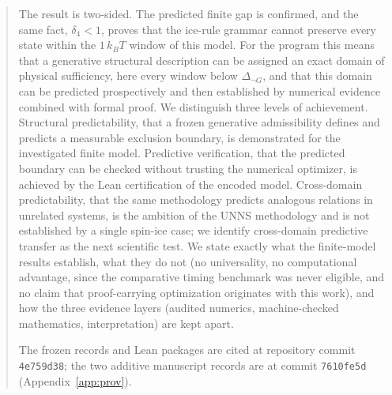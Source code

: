 \documentclass[11pt,a4paper]{article}
\theoremstyle{plain}
\theoremstyle{definition}
\theoremstyle{remark}
\begin{document}
\begin{abstract}
The result is two-sided. The predicted finite gap is confirmed, and the same fact, $\delta_4<1$, proves that the ice-rule grammar cannot preserve every state within the $1\,k_BT$ window of this model. For the program this means that a generative structural description can be assigned an exact domain of physical sufficiency, here every window below $\Delta_{\neg G}$, and that this domain can be predicted prospectively and then established by numerical evidence combined with formal proof. We distinguish three levels of achievement. Structural predictability, that a frozen generative admissibility defines and predicts a measurable exclusion boundary, is demonstrated for the investigated finite model. Predictive verification, that the predicted boundary can be checked without trusting the numerical optimizer, is achieved by the Lean certification of the encoded model. Cross-domain predictability, that the same methodology predicts analogous relations in unrelated systems, is the ambition of the UNNS methodology and is not established by a single spin-ice case; we identify cross-domain predictive transfer as the next scientific test. We state exactly what the finite-model results establish, what they do not (no universality, no computational advantage, since the comparative timing benchmark was never eligible, and no claim that proof-carrying optimization originates with this work), and how the three evidence layers (audited numerics, machine-checked mathematics, interpretation) are kept apart.

The frozen records and Lean packages are cited at repository commit \texttt{4e759d38}; the two additive manuscript records are at commit \texttt{7610fe5d} (Appendix~\ref{app:prov}).
\end{abstract}
\end{document}
